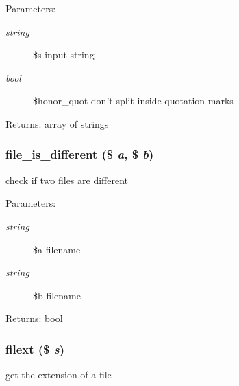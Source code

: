 \begin{Desc}
\item[Parameters:]
\begin{description}
\item[{\em string}]\$s input string \item[{\em bool}]\$honor\_\-quot don't split inside quotation marks \end{description}
\end{Desc}
\begin{Desc}
\item[Returns:]array of strings \end{Desc}
\hypertarget{util_8inc_8php_9c9a81ec9dba8b2870cbb365f8139866}{
\subsubsection[{file\_\-is\_\-different}]{\setlength{\rightskip}{0pt plus 5cm}file\_\-is\_\-different (\$ {\em a}, \/  \$ {\em b})}}
\label{util_8inc_8php_9c9a81ec9dba8b2870cbb365f8139866}


check if two files are different

\begin{Desc}
\item[Parameters:]
\begin{description}
\item[{\em string}]\$a filename \item[{\em string}]\$b filename \end{description}
\end{Desc}
\begin{Desc}
\item[Returns:]bool \end{Desc}
\hypertarget{util_8inc_8php_6d9392e51344c2e8720a0c1982ebea21}{
\subsubsection[{filext}]{\setlength{\rightskip}{0pt plus 5cm}filext (\$ {\em s})}}
\label{util_8inc_8php_6d9392e51344c2e8720a0c1982ebea21}


get the extension of a file

